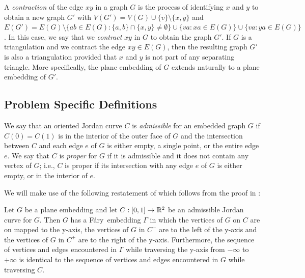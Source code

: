 \documentclass{patmorin}
\newcommand{\Fary}{Fáry}
\begin{document}
A \emph{contraction} of the edge $xy$ in a graph $G$ is the
process of identifying $x$ and $y$ to obtain a new graph $G'$ with
$V(G')=V(G)\cup\{v\}\setminus\{x,y\}$ and $E(G')=E(G)\setminus\{ab\in
E(G): \{a,b\}\cap\{x,y\}\neq\emptyset\}\cup\{va: xa\in E(G)\}\cup
\{va:ya\in E(G)\}$.  In this case, we say that we \emph{contract} $xy$
in $G$ to obtain the graph $G'$.  If $G$ is a triangulation and we
contract the edge $xy\in E(G)$, then the resulting graph $G'$ is also
a triangulation provided that $x$ and $y$ is not part of any separating
triangle. More specifically, the plane embedding of $G$ extends naturally
to a plane embedding of $G'$.

\subsection{Problem Specific Definitions}

We say that an oriented Jordan curve $C$ is \emph{admissible} for an
embedded graph $G$ if $C(0)=C(1)$ is in the interior of the outer face
of $G$ and the intersection between $C$ and each edge $e$ of $G$ is
either empty, a single point, or the entire edge $e$.  We say that $C$
is \emph{proper} for $G$ if it is admissible and it does not contain any
vertex of $G$; i.e., $C$ is proper if its intersection with any edge $e$
of $G$ is either empty, or in the interior of $e$.


We will make use of the following restatement of 
which follows from the proof in \cite{dalozzo.dujmovic.ea:drawing}:
\begin{thm}
   Let $G$ be a plane embedding and let $C:[0,1]\to\mathbb{R}^2$ be an admissible
   Jordan curve for $G$.  Then $G$ has a \Fary\ embedding $\Gamma$
   in which the vertices of $G$ on $C$ are on mapped to the y-axis,
   the vertices of $G$ in $C^-$ are to the left of the y-axis and the
   vertices of $G$ in $C^+$ are to the right of the y-axis. Furthermore,
   the sequence of vertices and edges encountered in $\Gamma$ while
   traversing the y-axis from $-\infty$ to $+\infty$ is identical to the
   sequence of vertices and edges encountered in $G$ while traversing $C$.
\end{thm}
\end{document}

